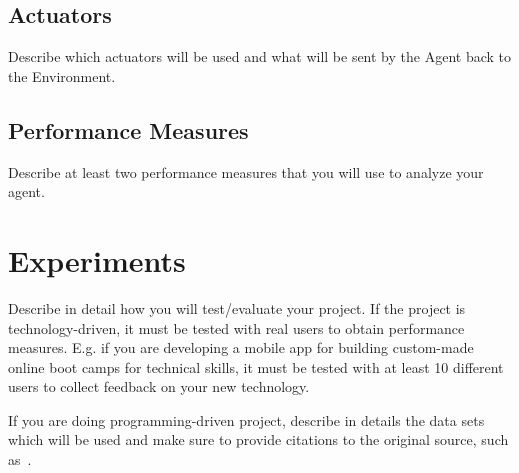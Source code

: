 \documentclass{article}
\begin{document}
\subsection{Actuators}
Describe which actuators will be used and what will be sent by the Agent back to the Environment.
\subsection{Performance Measures}
Describe at least two performance measures that you will use to analyze your agent.

\section{Experiments}
Describe in detail how you will test/evaluate your project.
If the project is technology-driven, it must be tested with real users to obtain performance measures.  E.g. if you are developing a mobile app for building custom-made online boot camps for technical skills, it must be tested with at least 10 different users to collect feedback on your new technology.

If you are doing programming-driven project, describe in details the data sets which will be used and make sure to provide citations to the original source, such as~\cite{knuthwebsite}. 

 

\end{document}
